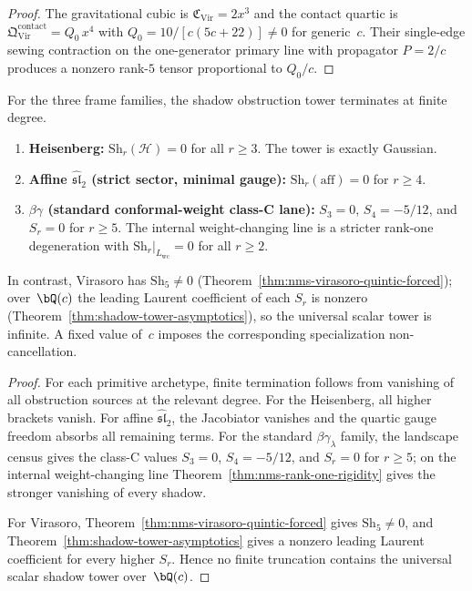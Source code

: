 \begin{proof}
The gravitational cubic is $\mathfrak C_{\mathrm{Vir}}=2x^3$ and the contact quartic is $\mathfrak Q^{\mathrm{contact}}_{\mathrm{Vir}}=Q_0\,x^4$ with $Q_0=10/[c(5c+22)]\neq 0$ for generic~$c$. Their single-edge sewing contraction on the one-generator primary line with propagator $P=2/c$ produces a nonzero rank-$5$ tensor proportional to $Q_0/c$.\qedhere
\end{proof}

\begin{theorem}
\label{thm:nms-finite-termination}
For the three frame families, the shadow obstruction tower terminates at finite degree.
\begin{enumerate}[label=\textup{(\roman*)}]
\item \textbf{Heisenberg:} $\mathrm{Sh}_r(\mathcal H)=0$ for all $r\ge 3$. The tower is exactly Gaussian.
\item \textbf{Affine $\widehat{\mathfrak{sl}}_2$ \textup{(strict sector, minimal gauge):}} $\mathrm{Sh}_r(\mathrm{aff})=0$ for $r\ge 4$.
\item \textbf{$\beta\gamma$ \textup{(standard conformal-weight class-C lane):}}
$S_3=0$, $S_4=-5/12$, and $S_r=0$ for $r\ge5$. The internal
weight-changing line is a stricter rank-one degeneration with
$\mathrm{Sh}_r|_{L_{\mathrm{wc}}}=0$ for all $r\ge2$.
\end{enumerate}
In contrast, Virasoro has $\mathrm{Sh}_5\neq 0$
(Theorem~\ref{thm:nms-virasoro-quintic-forced}); over~$\bQ(c)$ the
leading Laurent coefficient of each $S_r$ is nonzero
(Theorem~\ref{thm:shadow-tower-asymptotics}), so the universal scalar
tower is infinite. A fixed value of~$c$ imposes the corresponding
specialization non-cancellation.
\end{theorem}

\begin{proof}
For each primitive archetype, finite termination follows from
vanishing of all obstruction sources at the relevant degree. For the
Heisenberg, all higher brackets vanish. For affine
$\widehat{\mathfrak{sl}}_2$, the Jacobiator vanishes and the quartic
gauge freedom absorbs all remaining terms. For the standard
$\beta\gamma_\lambda$ family, the landscape census gives the class-C
values $S_3=0$, $S_4=-5/12$, and $S_r=0$ for $r\ge5$; on the
internal weight-changing line Theorem~\ref{thm:nms-rank-one-rigidity}
gives the stronger vanishing of every shadow.

For Virasoro, Theorem~\ref{thm:nms-virasoro-quintic-forced} gives
$\mathrm{Sh}_5\neq 0$, and
Theorem~\ref{thm:shadow-tower-asymptotics} gives a nonzero leading
Laurent coefficient for every higher $S_r$. Hence no finite
truncation contains the universal scalar shadow tower over~$\bQ(c)$.\qedhere
\end{proof}

